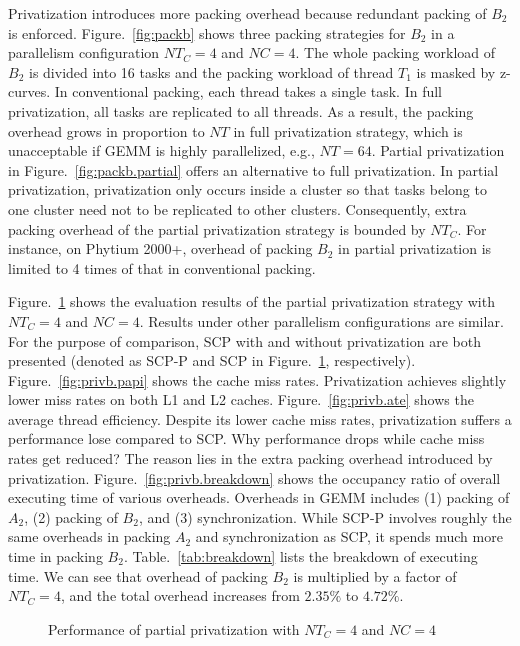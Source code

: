 Privatization introduces more packing overhead because
redundant packing of $B_2$ is enforced.
Figure.~\ref{fig:packb} shows three packing strategies for $B_2$
in a parallelism configuration $NT_C=4$ and $NC=4$.
The whole packing workload of $B_2$ is divided into 16 tasks
and the packing workload of thread $T_1$ is masked by z-curves. 
In conventional packing, each thread takes a single task.
In full privatization, all tasks are replicated to all threads.
As a result, the packing overhead grows in proportion to $NT$
in full privatization strategy, which is unacceptable
if GEMM is highly parallelized, e.g., $NT=64$.
Partial privatization in Figure.~\ref{fig:packb.partial}
offers an alternative to full privatization.
In partial privatization, privatization only occurs inside
a cluster so that tasks belong to one cluster need not to be
replicated to other clusters.
Consequently, extra packing overhead of the partial privatization
strategy is bounded by $NT_C$.
For instance, on Phytium 2000+, overhead of packing $B_2$
in partial privatization is limited to 4 times
of that in conventional packing.

Figure.~\ref{fig:privb} shows the evaluation results of the partial
privatization strategy with $NT_C=4$ and $NC=4$.
Results under other parallelism configurations are similar.
For the purpose of comparison,
SCP with and without privatization are both presented
(denoted as SCP-P and SCP in Figure.~\ref{fig:privb}, respectively).
Figure.~\ref{fig:privb.papi} shows the cache miss rates.
Privatization achieves slightly lower miss rates on both L1 and L2 caches.
Figure.~\ref{fig:privb.ate} shows the average thread efficiency.
Despite its lower cache miss rates,
privatization suffers a performance lose compared to SCP.
Why performance drops while cache miss rates get reduced?
The reason lies in the extra packing overhead introduced by privatization.
Figure.~\ref{fig:privb.breakdown} shows the occupancy ratio
of overall executing time of various overheads.
Overheads in GEMM includes
(1) packing of $A_2$, (2) packing of $B_2$,
and (3) synchronization.
While SCP-P involves roughly the same overheads in
packing $A_2$ and synchronization as SCP,
it spends much more time in packing $B_2$.
Table.~\ref{tab:breakdown} lists the breakdown of
executing time. We can see that overhead of packing $B_2$
is multiplied by a factor of $NT_C=4$,
and the total overhead increases from $2.35\%$ to $4.72\%$.

\begin{figure}
  \centering
  \caption{Performance of partial privatization with $NT_C=4$ and $NC=4$}
  \label{fig:privb}
\end{figure}

